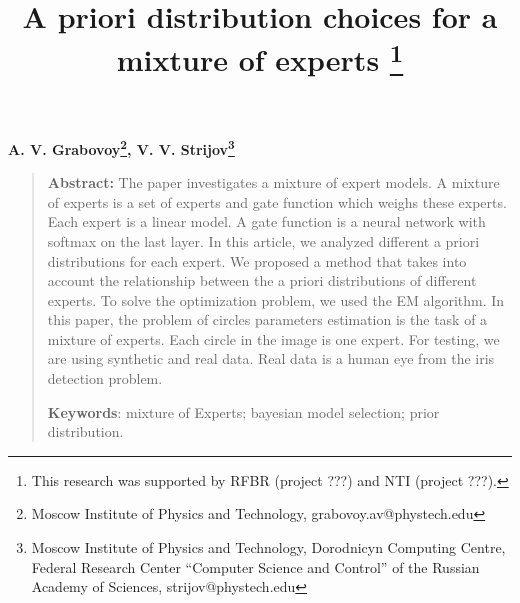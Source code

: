 \documentclass[12pt, twoside]{article}
\begin{document}
\title{\bf A priori distribution choices for a mixture of experts \thanks{This research was supported by RFBR (project ???) and NTI (project ???).}}
\date{}
\author{}
\maketitle

\begin{center}
\bf
A. V. Grabovoy\footnote{Moscow Institute of Physics and Technology, grabovoy.av@phystech.edu},
V. V. Strijov\footnote{Moscow Institute of Physics and Technology, Dorodnicyn Computing Centre, Federal Research Center “Computer Science and Control” of the Russian Academy of Sciences, strijov@phystech.edu}
\end{center}

{\centering\begin{quote}
\textbf{Abstract:} 
The paper investigates a mixture of expert models.
A mixture of experts is a set of experts and gate function which weighs these experts.
Each expert is a linear model.
A gate function is a neural network with softmax on the last layer.
In this article, we analyzed different a priori distributions for each expert.
We proposed a method that takes into account the relationship between the a priori distributions of different experts.
To solve the optimization problem, we used the EM algorithm.
In this paper, the problem of circles parameters estimation is the task of a mixture of experts.
Each circle in the image is one expert.
For testing, we are using synthetic and real data.
Real data is a human eye from the iris detection problem.



\smallskip
\textbf{Keywords}: mixture of Experts; bayesian model selection; prior distribution.

\smallskip
\end{quote}
}
\end{document}
